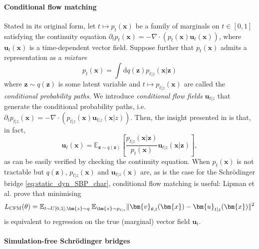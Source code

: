 \documentclass{article}
\newcommand{\diff}{\mathrm{d}}
\newcommand{\E}{\mathbb{E}}
\theoremstyle{newstyle}
\begin{document}
\paragraph{Conditional flow matching}

Stated in its original form, let $t \mapsto p_t(\bm{x})$ be a family of marginals on $t \in [0, 1]$ satisfying the continuity equation $\partial_t p_t(\bm{x}) = -\nabla \cdot (p_t(\bm{x}) \bm{u}_t(\bm{x}))$, where $\bm{u}_t(\bm{x})$ is a time-dependent vector field. 
Suppose further that $p_t(\bm{x})$ admits a representation as a \emph{mixture}
\[
  p_t(\bm{x}) = \int \diff q(\bm{z}) p_{t|z}(\bm{x} | \bm{z})
\]
where $\bm{z} \sim q(\bm{z})$ is some latent variable and $t \mapsto p_{t|z}(\bm{x})$ are called the \emph{conditional probability paths}. We introduce \emph{conditional flow fields} $\bm{u}_{t|z}$ that generate the conditional probability paths, i.e. $\partial_t p_{t|z}(\bm{x}) = -\nabla \cdot (p_{t|z}(\bm{x}) \bm{u}_{t|z}(\bm{x} | z))$. Then, the insight presented in \cite[Theorem 1]{lipman2022flow} is that, in fact, 
\[
  \bm{u}_t(\bm{x}) = \E_{\bm{z} \sim q(\bm{z})} \left[ \frac{p_{t|z}(\bm{x} | \bm{z})}{p_t(\bm{x})} \bm{u}_{t|z}(\bm{x} | \bm{z}) \right],
\]
as can be easily verified by checking the continuity equation.
When $p_t(\bm{x})$ is not tractable but $q(\bm{z})$, $p_{t|z}(\bm{x})$ and $\bm{u}_{t|z}(\bm{x})$ are, as is the case for the Schr\"odinger bridge \eqref{eq:static_dyn_SBP_char}, conditional flow matching is useful: Lipman et al. \cite[Theorem 2]{lipman2022flow} prove that minimising 
\begin{equation}
  L_{\rm{CFM}}(\theta) = \E_{t \sim U[0, 1], \bm{z} \sim q} \: \E_{\bm{x} \sim p_{t|z}} \| \bm{v}_{\theta, t}(\bm{x}) - \bm{u}_{t|z}(\bm{x}) \|^2
\end{equation}
is equivalent to regression on the true (marginal) vector field $\bm{u}_t$. 

\paragraph{Simulation-free Schr\"odinger bridges}
\end{document}

